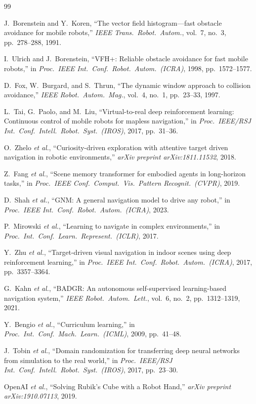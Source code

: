 \documentclass[letterpaper, 10pt, journal]{IEEEtran}
\begin{document}
\begin{thebibliography}{99}

J.~Borenstein and Y.~Koren,
``The vector field histogram---fast obstacle avoidance for mobile robots,''
\emph{IEEE Trans.\ Robot.\ Autom.}, vol.~7, no.~3, pp.~278--288, 1991.

I.~Ulrich and J.~Borenstein,
``VFH+: Reliable obstacle avoidance for fast mobile robots,''
in \emph{Proc.\ IEEE Int.\ Conf.\ Robot.\ Autom.\ (ICRA)}, 1998, pp.~1572--1577.

D.~Fox, W.~Burgard, and S.~Thrun,
``The dynamic window approach to collision avoidance,''
\emph{IEEE Robot.\ Autom.\ Mag.}, vol.~4, no.~1, pp.~23--33, 1997.

L.~Tai, G.~Paolo, and M.~Liu,
``Virtual-to-real deep reinforcement learning: Continuous control of mobile robots
for mapless navigation,''
in \emph{Proc.\ IEEE/RSJ Int.\ Conf.\ Intell.\ Robot.\ Syst.\ (IROS)}, 2017,
pp.~31--36.

O.~Zhelo \emph{et al.},
``Curiosity-driven exploration with attentive target driven navigation in robotic
environments,''
\emph{arXiv preprint arXiv:1811.11532}, 2018.

Z.~Fang \emph{et al.},
``Scene memory transformer for embodied agents in long-horizon tasks,''
in \emph{Proc.\ IEEE Conf.\ Comput.\ Vis.\ Pattern Recognit.\ (CVPR)}, 2019.

D.~Shah \emph{et al.},
``GNM: A general navigation model to drive any robot,''
in \emph{Proc.\ IEEE Int.\ Conf.\ Robot.\ Autom.\ (ICRA)}, 2023.

P.~Mirowski \emph{et al.},
``Learning to navigate in complex environments,''
in \emph{Proc.\ Int.\ Conf.\ Learn.\ Represent.\ (ICLR)}, 2017.

Y.~Zhu \emph{et al.},
``Target-driven visual navigation in indoor scenes using deep reinforcement learning,''
in \emph{Proc.\ IEEE Int.\ Conf.\ Robot.\ Autom.\ (ICRA)}, 2017, pp.~3357--3364.

G.~Kahn \emph{et al.},
``BADGR: An autonomous self-supervised learning-based navigation system,''
\emph{IEEE Robot.\ Autom.\ Lett.}, vol.~6, no.~2, pp.~1312--1319, 2021.

Y.~Bengio \emph{et al.},
``Curriculum learning,''
in \emph{Proc.\ Int.\ Conf.\ Mach.\ Learn.\ (ICML)}, 2009, pp.~41--48.

J.~Tobin \emph{et al.},
``Domain randomization for transferring deep neural networks from simulation to the
real world,''
in \emph{Proc.\ IEEE/RSJ Int.\ Conf.\ Intell.\ Robot.\ Syst.\ (IROS)}, 2017,
pp.~23--30.

OpenAI \emph{et al.},
``Solving Rubik's Cube with a Robot Hand,''
\emph{arXiv preprint arXiv:1910.07113}, 2019.

\end{thebibliography}
\end{document}
